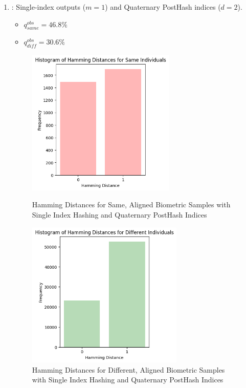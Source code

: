 \begin{enumerate}
    \item {}: Single-index outputs (\(m=1\)) and Quaternary PostHash indices (\(d=2\)).
    \begin{itemize}
        \item \(q_{same}^{obs} = 46.8\%\)
        \item \(q_{diff}^{obs} = 30.6\%\)
    \end{itemize}

    \begin{figure}[H]
        \centering
        \begin{minipage}[b]{0.48\linewidth}
            \centering
            \includegraphics[width=\linewidth,height=7cm,keepaspectratio]{latex-img/d2same.png}
            \caption{Hamming Distances for Same, Aligned Biometric Samples with Single Index Hashing and Quaternary PostHash Indices}
            \label{mu_same}
        \end{minipage}
        \hfill
        \begin{minipage}[b]{0.48\linewidth}
            \centering
            \includegraphics[width=\linewidth,height=7cm,keepaspectratio]{latex-img/d2diff.png}
            \caption{Hamming Distances for Different, Aligned Biometric Samples with Single Index Hashing and Quaternary PostHash Indices}
            \label{mu_diff}
        \end{minipage}
    \end{figure}
    

\end{enumerate}
